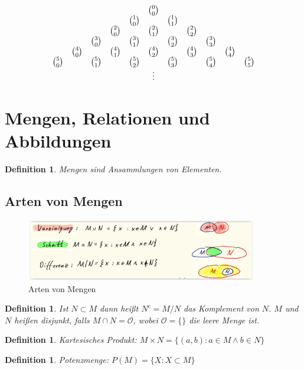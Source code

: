 \documentclass[12pt,a4paper]{report}%
\newtheorem{definition}[satz]{Definition}
\numberwithin{equation}{section}
\numberwithin{equation}{subsection}
\begin{document}
  \begin{align}
    \begin{array}{c c c c c c c c c c c}
      \; & \; &  \; & \; & \; &  \binom{0}{0} & \; & \; & \; & \; & \;\\
      \; & \; &  \; & \; & \binom{1}{0}  & \; &  \binom{1}{1} & \; & \; & \; & \;\\
      \; & \; &  \; & \binom{2}{0}  & \; & \binom{2}{1}  & \; & \binom{2}{2}  & \; & \; & \;\\
      \; & \; &  \binom{3}{0}  & \; & \binom{3}{1}  & \; & \binom{3}{2}  & \; & \binom{3}{3}  & \; & \;\\
      \; & \binom{4}{0}  &  \; & \binom{4}{1}  & \; &  \binom{4}{2} & \; & \binom{4}{3}  & \; & \binom{4}{4}  & \;\\
      \binom{5}{0}  & \; &  \binom{5}{1}  & \; & \binom{5}{2} & \; & \binom{5}{3} & \; & \binom{5}{4}  & \; & \binom{5}{5} \\
      \; & \; &  \; & \; & \; &\vdots& \; & \; & \; & \; & \;\\
    \end{array}
  \end{align}
  \newpage
  
\section{Mengen, Relationen und Abbildungen}
  \begin{definition}
    Mengen sind Ansammlungen von Elementen.
  \end{definition}
  \subsection{Arten von Mengen}
	  \begin{figure}[htbp] 
		  \centering
		  \includegraphics[width=0.9\textwidth]{mengen_arten.png}
		  \caption{Arten von Mengen\protect\cite{HM12}}
		  \label{fig:mengen_arten}
		\end{figure}
	  \begin{definition}
	    Ist $N \subset M$ dann heißt $N^c = M/N$ das Komplement von $N$. $M$ und $N$ heißen disjunkt, falls $M \cap N = \mathcal{O}$, wobei $\mathcal{O} = \lbrace \rbrace$ die leere Menge ist.
	  \end{definition}
	  \begin{definition}
	    Kartesisches Produkt: $M \times N = \lbrace (a,b): a \in M \land b \in N\rbrace$
	  \end{definition}
	  \begin{definition}
	    Potenzmenge: $P(M) = \lbrace X:X\subset M\rbrace$
	  \end{definition}
\end{document}
